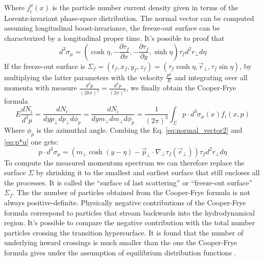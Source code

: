 \documentclass[12pt,a4paper]{book}
\begin{document}
	Where $j_i^\mu(x)$ is the particle number current density given in terms of the Lorentz-invariant phase-space distribution. The normal vector can be computed assuming longitudinal boost-invariance, the freeze-out surface can be characterized by a longitudinal proper time. It's possible to proof that
	\begin{equation}
		d^3 \sigma_\mu=\left(\cosh \eta ,-\frac{\partial \tau_f}{\partial x},-\frac{\partial \tau_f}{\partial y},\sinh\eta \right) \tau_f d^2 r_\perp d\eta
		\label{eq:normal_vector2}
	\end{equation}
	If the freeze-out surface is $\Sigma_f=(t_f,x_f,y_f,z_f)=(\tau_f \cosh \eta, \vec{r}_\perp,\tau_f \sin \eta)$,
	by multiplying the latter parameters with the velocity $\frac{p^\mu}{E}$ and integrating over all momenta with measure $\frac{d^3 p}{(2\hbar\pi)^3}=\frac{d^3 p}{(2\pi)^3}$, we finally obtain the Cooper-Frye formula
	\begin{equation}
		\boxed{
			E \frac{dN_i}{d^3 p}= \frac{dN_i}{dy p_\perp dp_\perp d\phi_p} = \frac{dN_i}{dy m_\perp dm_\perp d\phi_p} = \frac{1}{(2\pi)^3} \int_{\Sigma} p \cdot d^3 \sigma_\mu (x) f_i (x,p) 
		}
		\label{eq:cooper-frye}
	\end{equation}
	Where $\phi_p$ is the azimuthal angle. Combing the Eq. \ref{eq:normal_vector2} and \ref{eq:p*u} one gets:
	\begin{equation}
		p \cdot d^3 \sigma_\mu= \left(m_\perp \cosh(y-\eta) -\vec{p}_\perp \cdot \nabla_\perp \tau_f(\vec{r}_\perp) \right) \tau_f d^2 r_\perp d\eta
	\end{equation}
	To compute the measured momentum spectrum we can therefore replace the surface $\Sigma$ by shrinking it to the smallest and earliest surface that still encloses all the processes. It is called the “surface of last scattering” or “freeze-out surface” $\Sigma_f$. The the number of particles obtained from the Cooper-Frye formula is not always positive-definite. Physically negative contributions of the Cooper-Frye formula correspond to particles that stream backwards into the hydrodynamical region. It's possible to compare the negative contribution with the total number particles crossing the transition hypersurface. It is found that the number of underlying inward crossings is much smaller than the one the Cooper-Frye formula gives under the assumption of equilibrium distribution functions \cite{Cooper-Frye}.
	
\end{document}

